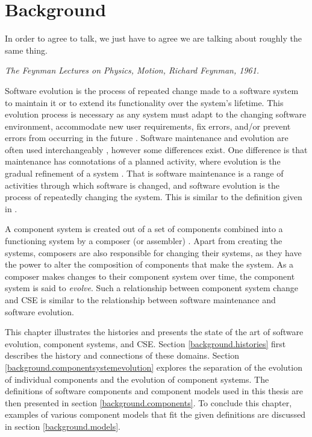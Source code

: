 \chapter{Background}
\label{background}
\epigraph{
In order to agree to talk, we just have to agree we are talking about roughly the same thing.
}
{\textit{The Feynman Lectures on Physics, Motion, Richard Feynman, 1961.}}

Software evolution \citep{lehman1980} is the process of repeated change made to a software system to maintain it or to extend its functionality over the system's lifetime.
This evolution process is necessary as any system must adapt to the changing software environment, accommodate new user requirements, 
fix errors, and/or prevent errors from occurring in the future \citep{IsoIec2006}.
Software maintenance and evolution are often used interchangeably \citep{Godfrey2008}, however some differences exist.
One difference is that maintenance has connotations of a planned activity, where evolution is the gradual refinement of a system \citep{lehman1980}.
That is software maintenance is a range of activities through which software is changed, and software evolution is the process of repeatedly changing the system.
This is similar to the definition given in \citep{lehman1980}.

A component system is created out of a set of components combined into a functioning system by a composer (or assembler) \citep{Szyperski2002}.
Apart from creating the systems, composers are also responsible for changing their systems, as they have the power to alter the composition of components that make the system.
As a composer makes changes to their component system over time, the component system is said to \textit{evolve}.
Such a relationship between component system change and CSE is similar to the relationship between software maintenance and software evolution.
 
This chapter illustrates the histories and presents the state of the art of software evolution, component systems, and CSE.
Section \ref{background.histories} first describes the history and connections of these domains. 
Section \ref{background.componentsystemevolution} explores the separation of the evolution of individual components and the evolution of component systems.
The definitions of software components and component models used in this thesis are then presented in section \ref{background.components}.
To conclude this chapter, examples of various component models that fit the given definitions are discussed in section \ref{background.models}.

